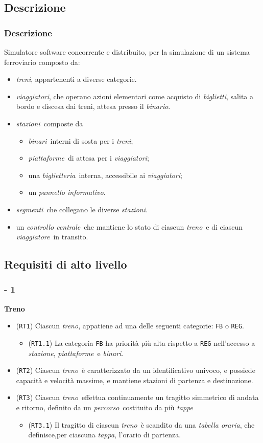 \documentclass[slidestop,compress,blackandwhite]{beamer}
\newcommand{\ttt}[1]{\texttt{#1}}
\newcommand{\ii}[1]{\textit{#1}}
\newcommand{\treno}{\ii{treno}}
\newcommand{\treni}{\ii{treni}}
\newcommand{\viaggiatore}{\ii{viaggiatore}}
\newcommand{\viaggiatori}{\ii{viaggiatori}}
\newcommand{\stazione}{\ii{stazione}}
\newcommand{\stazioni}{\ii{stazioni}}
\newcommand{\piattaforme}{\ii{piattaforme}}
\newcommand{\binario}{\ii{binario}}
\newcommand{\binari}{\ii{binari}}
\newcommand{\tickets}{\ii{biglietti}}
\newcommand{\segmenti}{\ii{segmenti}}
\newcommand{\route}{\ii{percorso}}
\newcommand{\stage}{\ii{tappa}}
\newcommand{\stages}{\ii{tappe}}
\newcommand{\biglietteria}{\ii{biglietteria}}
\newcommand{\timetable}{\ii{tabella oraria}}
\newcommand{\controller}{\ii{controllo centrale}}
\newcommand{\itemt}[1]{\item (\ttt{#1})}
\begin{document}
	\subsection{Descrizione}
	\begin{frame}
		\frametitle{Descrizione}
		Simulatore software concorrente e distribuito, per la simulazione di un sistema ferroviario composto da:
		\begin{itemize}
			\item \treni, appartenenti a diverse categorie.
			\item \viaggiatori, che operano azioni elementari come acquisto di \tickets, salita a bordo e discesa dai treni, attesa presso il \binario.
			\item \stazioni~composte da 
				\begin{itemize}
					\item \binari~interni di sosta per i \treni;
					\item \piattaforme~di attesa per i \viaggiatori;
					\item una \biglietteria~interna, accessibile ai \viaggiatori;
					\item un \ii{pannello informativo}.
				\end{itemize}
			\item \segmenti~che collegano le diverse \stazioni.
			\item un \controller~che mantiene lo stato di ciascun \treno~e di ciascun \viaggiatore~in transito.
		\end{itemize}
	\end{frame}
	
	\subsection{Requisiti di alto livello}\label{requirements}
	\begin{frame}
	
		\frametitle{ - 1}
		\textbf{Treno}
		\begin{itemize}
			\itemt{RT1} Ciascun \treno, appatiene ad una delle seguenti categorie: \ttt{FB} o \ttt{REG}.
				\begin{itemize}
					\itemt{RT1.1} La categoria \ttt{FB} ha priorità più alta rispetto a \ttt{REG} nell'accesso a \stazione, \piattaforme~e \binari.
				\end{itemize}
			\itemt{RT2} Ciascun \treno~è caratterizzato da un identificativo univoco, e possiede capacità e velocità massime, e mantiene stazioni di partenza e destinazione.
			\itemt{RT3} Ciascun \treno~effettua continuamente un tragitto simmetrico di andata e ritorno, definito da un \route~costituito da più \stages
				\begin{itemize}
					\itemt{RT3.1} Il tragitto di ciascun \treno~è scandito da una \timetable, che definisce,per ciascuna \stage, l'orario di partenza.
				\end{itemize}
		\end{itemize}
	\end{frame}
\end{document}
